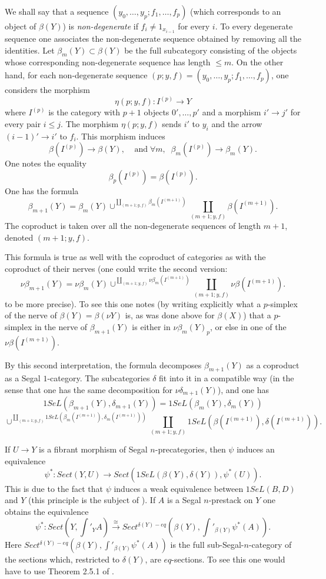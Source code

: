 We shall say
that a sequence $(y_0,\ldots , y_p; f_1,\ldots , f_p)$ (which corresponds to an
object of $\beta (Y)$) is {\em non-degenerate} if $f_i\neq 1_{x_{i-1}}$
for every $i$. To every degenerate sequence one associates the
non-degenerate sequence obtained by removing all the identities. Let $\beta
_m(Y)\subset \beta (Y)$ be the full subcategory consisting
of the objects whose
corresponding non-degenerate sequence has length $\leq m$. On the other
hand, for each non-degenerate sequence $(p; y,f)=(y_0,\ldots , y_p;
f_1,\ldots , f_p)$, one considers the morphism
$$
\eta (p; y,f): I^{(p)}\rightarrow Y
$$
where $I^{(p)}$ is the category with $p+1$ objects $0',\ldots , p'$ and a
morphism $i'\rightarrow j'$ for every pair $i\leq j$. The morphism
$\eta (p; y,f)$ sends $i'$ to $y_i$ and the arrow $(i-1)'\rightarrow i'$ to
$f_i$. This morphism induces
$$
\beta (I^{(p)})\rightarrow \beta (Y),\;\;\;\; \mbox{and} \; \forall m,\;\;
\beta _m (I^{(p)})\rightarrow \beta _m(Y).
$$
One notes the equality
$$
\beta _p(I^{(p)})=\beta (I^{(p)}).
$$
One has the formula
$$
\beta _{m+1}(Y)= \beta _{m}(Y) \cup ^{\coprod _{(m+1; y,f)}\beta _m(I^{(m+1)})}
\coprod _{(m+1; y,f)}\beta (I^{(m+1)}).
$$
The coproduct is taken over all the non-degenerate sequences of length
$m+1$, denoted $(m+1; y,f)$.

This formula is true as well with the coproduct of categories as with
the coproduct of their nerves (one could write the second version:
$$
\nu \beta _{m+1}(Y)= \nu \beta _{m}(Y) \cup ^{\coprod _{(m+1; y,f)}\nu \beta
_m(I^{(m+1)})}  \coprod _{(m+1; y,f)}\nu \beta (I^{(m+1)}).
$$
to be more precise).
To see this one notes (by writing explicitly what a
$p$-simplex of the nerve of $\beta (Y)= \beta (\nu Y)$ is, as was done above
for $\beta (X)$) that a $p$-simplex in the nerve of $\beta _{m+1}(Y)$ is either
in $\nu \beta _{m}(Y)_p$, or else in one of the
$\nu \beta (I^{(m+1)})$.

By this second interpretation,
the formula decomposes $\beta _{m+1}(Y)$
as a coproduct as a Segal $1$-category. The subcategories
$\delta$
fit into it in a compatible way (in
the sense that one has the same decomposition
for $\nu \delta _{m+1}(Y)$), and one has
$$
1SeL(\beta _{m+1}(Y), \delta  _{m+1}(Y)) =
1SeL(\beta _{m}(Y),\delta _m(Y))
$$
$$
\cup ^{\coprod _{(m+1; y,f)}1SeL(\beta
_m(I^{(m+1)}),\delta _m(I^{(m+1)}))}  \coprod _{(m+1; y,f)} 1SeL(\beta
(I^{(m+1)}),\delta (I^{(m+1)})).
$$

If $U\rightarrow Y$ is a fibrant morphism of Segal $n$-precategories, then
$\psi$ induces an equivalence
$$
\psi ^{\ast}: Sect (Y, U)\rightarrow Sect (1SeL(\beta (Y), \delta (Y)), \psi
^{\ast}(U)).
$$
This is due to the fact that $\psi $ induces a weak equivalence between
$1SeL(B,D)$
and $Y$ (this principle is the subject of \cite{DwyerKanDiags}). If $A$ is a
Segal $n$-prestack on $Y$ one obtains the equivalence $$
\psi ^{\ast}: Sect (Y, \int '_YA)\stackrel{\cong}{\rightarrow}
Sect ^{\delta (Y)-eq}(\beta (Y), \int '_{\beta (Y)}\psi ^{\ast}(A)).
$$
Here $Sect ^{\delta (Y)-eq}(\beta (Y), \int '_{\beta (Y)}\psi ^{\ast}(A))$
is the full sub-Segal-$n$-category
of the sections which, restricted to $\delta (Y)$, are $eq$-sections.
To see this one would have to use Theorem 2.5.1 of \cite{limits}.



